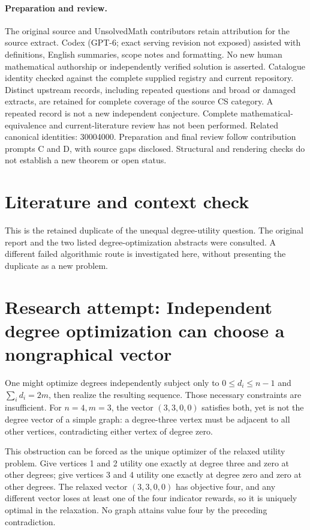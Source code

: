 \documentclass[11pt]{article}
\begin{document}
\paragraph{Preparation and review.}
The original source and UnsolvedMath contributors retain attribution for the source extract. Codex (GPT-6; exact serving revision not exposed) assisted with definitions, English summaries, scope notes and formatting. No new human mathematical authorship or independently verified solution is asserted. Catalogue identity checked against the complete supplied registry and current repository. Distinct upstream records, including repeated questions and broad or damaged extracts, are retained for complete coverage of the source CS category. A repeated record is not a new independent conjecture. Complete mathematical-equivalence and current-literature review has not been performed. Related canonical identities: 30004000. Preparation and final review follow contribution prompts C and D, with source gaps disclosed. Structural and rendering checks do not establish a new theorem or open status.
\label{end:statement}

\section{Literature and context check}
This is the retained duplicate of the unequal degree-utility question. The original report and the two listed degree-optimization abstracts were consulted. A different failed algorithmic route is investigated here, without presenting the duplicate as a new problem.
\section{Research attempt: Independent degree optimization can choose a nongraphical vector}
One might optimize degrees independently subject only to $0\le d_i\le n-1$ and $\sum_i d_i=2m$, then realize the resulting sequence. Those necessary constraints are insufficient. For $n=4,m=3$, the vector $(3,3,0,0)$ satisfies both, yet is not the degree vector of a simple graph: a degree-three vertex must be adjacent to all other vertices, contradicting either vertex of degree zero.

This obstruction can be forced as the unique optimizer of the relaxed utility problem. Give vertices 1 and 2 utility one exactly at degree three and zero at other degrees; give vertices 3 and 4 utility one exactly at degree zero and zero at other degrees. The relaxed vector $(3,3,0,0)$ has objective four, and any different vector loses at least one of the four indicator rewards, so it is uniquely optimal in the relaxation. No graph attains value four by the preceding contradiction.
\end{document}
